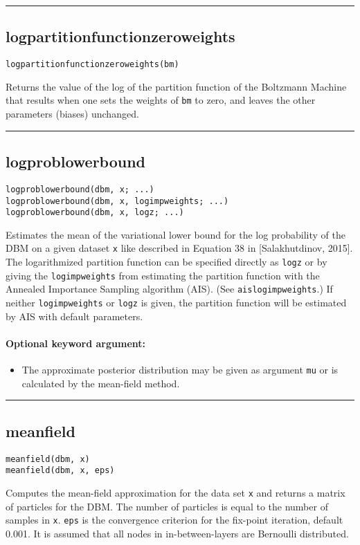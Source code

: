 \noindent\rule{\textwidth}{1pt}
\subsection*{logpartitionfunctionzeroweights}  \label{bms_logpartitionfunctionzeroweights}
\begin{verbatim}
logpartitionfunctionzeroweights(bm)
\end{verbatim}
Returns the value of the log of the partition function of the Boltzmann Machine that results when one sets the weights of \texttt{bm} to zero, and leaves the other parameters (biases) unchanged.

\noindent\rule{\textwidth}{1pt}
\subsection*{logproblowerbound}  \label{bms_logproblowerbound}
\begin{verbatim}
logproblowerbound(dbm, x; ...)
logproblowerbound(dbm, x, logimpweights; ...)
logproblowerbound(dbm, x, logz; ...)
\end{verbatim}
Estimates the mean of the variational lower bound for the log probability of the DBM on a given dataset \texttt{x} like described in Equation 38 in [Salakhutdinov, 2015]. The logarithmized partition function can be specified directly as \texttt{logz} or by giving the \texttt{logimpweights} from estimating the partition function with the Annealed Importance Sampling algorithm (AIS). (See \texttt{aislogimpweights}.) If neither \texttt{logimpweights} or \texttt{logz} is given, the partition function will be estimated by AIS with default parameters.

\paragraph*{Optional keyword argument:}
\begin{itemize}
\item The approximate posterior distribution may be given as argument \texttt{mu} or is calculated by the mean-field method.

\end{itemize}
\noindent\rule{\textwidth}{1pt}
\subsection*{meanfield}  \label{bms_meanfield}
\begin{verbatim}
meanfield(dbm, x)
meanfield(dbm, x, eps)
\end{verbatim}
Computes the mean-field approximation for the data set \texttt{x} and returns a matrix of particles for the DBM. The number of particles is equal to the number of samples in \texttt{x}. \texttt{eps} is the convergence criterion for the fix-point iteration, default 0.001. It is assumed that all nodes in in-between-layers are Bernoulli distributed.

